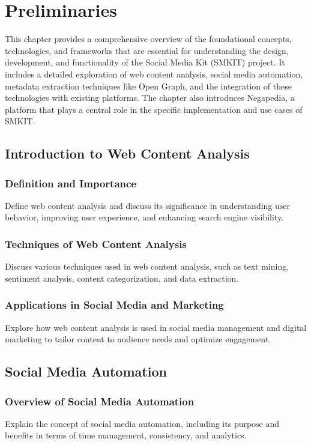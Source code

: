 
\chapter{Preliminaries}
\label{chp:preliminaries}

This chapter provides a comprehensive overview of the foundational concepts, technologies, and frameworks that are essential for understanding the design, development, and functionality of the Social Media Kit (SMKIT) project. It includes a detailed exploration of web content analysis, social media automation, metadata extraction techniques like Open Graph, and the integration of these technologies with existing platforms. The chapter also introduces Negapedia, a platform that plays a central role in the specific implementation and use cases of SMKIT. 

\section{Introduction to Web Content Analysis}
\label{sec:web-content-analysis}
\subsection{Definition and Importance}
Define web content analysis and discuss its significance in understanding user behavior, improving user experience, and enhancing search engine visibility.

\subsection{Techniques of Web Content Analysis}
Discuss various techniques used in web content analysis, such as text mining, sentiment analysis, content categorization, and data extraction.

\subsection{Applications in Social Media and Marketing}
Explore how web content analysis is used in social media management and digital marketing to tailor content to audience needs and optimize engagement.

\section{Social Media Automation}
\label{sec:social-media-automation}
\subsection{Overview of Social Media Automation}
Explain the concept of social media automation, including its purpose and benefits in terms of time management, consistency, and analytics.

